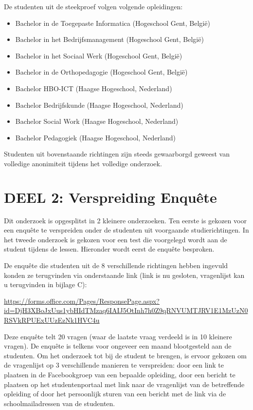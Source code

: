 De studenten uit de steekproef volgen volgende opleidingen:
\begin{itemize}
\item Bachelor in de Toegepaste Informatica (Hogeschool Gent, België)
\item Bachelor in het Bedrijfsmanagement (Hogeschool Gent, België)
\item Bachelor in het Sociaal Werk (Hogeschool Gent, België)
\item Bachelor in de Orthopedagogie (Hogeschool Gent, België)

\item Bachelor HBO-ICT (Haagse Hogeschool, Nederland)
\item Bachelor Bedrijfskunde (Haagse Hogeschool, Nederland)
\item Bachelor Social Work (Haagse Hogeschool, Nederland)
\item Bachelor Pedagogiek (Haagse Hogeschool, Nederland)
\end{itemize}

Studenten uit bovenstaande richtingen zijn steeds gewaarborgd geweest van volledige anonimiteit tijdens het volledige onderzoek. 

\section{DEEL 2: Verspreiding Enquête}
\label{sec:enquete}

Dit onderzoek is opgesplitst in 2 kleinere onderzoeken. Ten eerste is gekozen voor een enquête te verspreiden onder de studenten uit voorgaande studierichtingen. In het tweede onderzoek is gekozen voor een test die voorgelegd wordt aan de student tijdens de lessen. Hieronder wordt eerst de enquête besproken.

De enquête die studenten uit de 8 verschillende richtingen hebben ingevuld konden ze terugvinden via onderstaande link (link is nu gesloten, vragenlijst kan u terugvinden in bijlage C):

\url{https://forms.office.com/Pages/ResponsePage.aspx?id=DjH3XBoJxUus1ybHIdTMzaq6IAIJ5OtInh7h0Z9qRNVUMTJRV1E1MzUzN0RSVkRPUExUUzEzNk1HVC4u}

Deze enquête telt 20 vragen (waar de laatste vraag verdeeld is in 10 kleinere vragen). De enquête is telkens voor ongeveer een maand blootgesteld aan de studenten. Om het onderzoek tot bij de student te brengen, is ervoor gekozen om de vragenlijst op 3 verschillende manieren te verspreiden: door een link te plaatsen in de Facebookgroep van een bepaalde opleiding, door een bericht te plaatsen op het studentenportaal met link naar de vragenlijst van de betreffende opleiding of door het persoonlijk sturen van een bericht met de link via de schoolmailadressen van de studenten.

